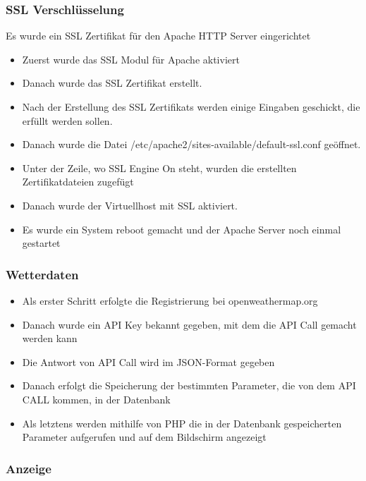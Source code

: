 \subsubsection{SSL Verschlüsselung}
Es wurde ein SSL Zertifikat für den Apache HTTP Server eingerichtet 
\begin{itemize}
	\item Zuerst wurde das SSL Modul für Apache aktiviert
\end{itemize}
\begin{itemize}
	\item Danach wurde das SSL Zertifikat erstellt. 
\end{itemize}
\begin{itemize}
	\item Nach der Erstellung des SSL Zertifikats werden einige Eingaben geschickt, die erfüllt werden sollen. 
\end{itemize}
\begin{itemize}
	\item Danach wurde die Datei /etc/apache2/sites-available/default-ssl.conf geöffnet.
\end{itemize}
\begin{itemize}
	\item Unter der Zeile, wo SSL Engine On steht, wurden die erstellten Zertifikatdateien zugefügt
\end{itemize}
\begin{itemize}
	\item Danach wurde der Virtuellhost mit SSL aktiviert. 
\end{itemize}
\begin{itemize}
	\item Es wurde ein System reboot gemacht und der Apache Server noch einmal gestartet
\end{itemize}
\subsubsection{Wetterdaten}
\begin{itemize}
	\item Als erster Schritt erfolgte die Registrierung bei openweathermap.org 
\end{itemize}
\begin{itemize}
	\item 	Danach wurde ein API Key bekannt gegeben, mit dem die API Call gemacht werden kann
\end{itemize}
\begin{itemize}
	\item Die Antwort von API Call wird im JSON-Format gegeben
\end{itemize}
\begin{itemize}
	\item Danach erfolgt die Speicherung der bestimmten Parameter, die von dem API CALL kommen, in der Datenbank
\end{itemize}
\begin{itemize}
	\item Als letztens werden mithilfe von PHP die in der Datenbank gespeicherten Parameter aufgerufen und auf dem Bildschirm angezeigt
\end{itemize}
\subsubsection{Anzeige}	

\label{\docname}
